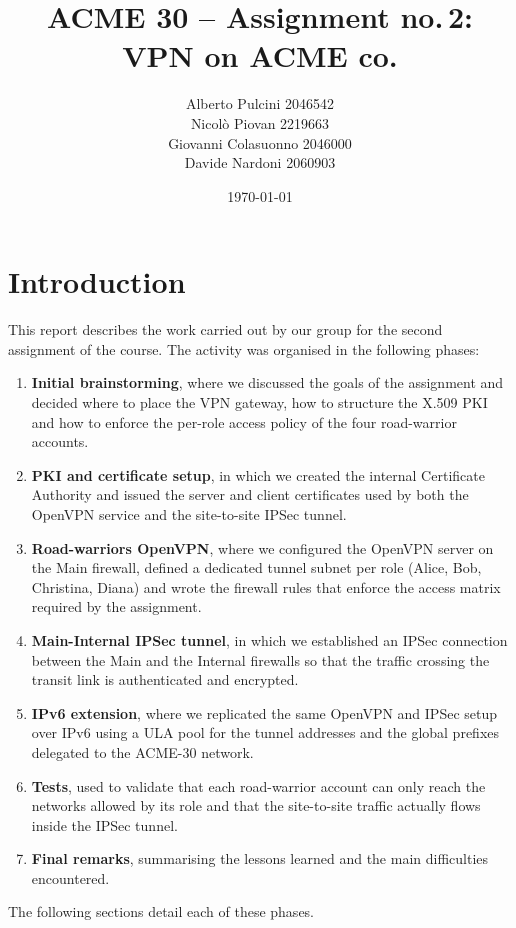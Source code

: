 \documentclass[twocolumn]{NobArticle}
\title{ACME 30 -- Assignment no.\,2: VPN on ACME co.}
\author{
    Alberto Pulcini 2046542 \\
    Nicolò Piovan 2219663 \\
    Giovanni Colasuonno 2046000 \\
    Davide Nardoni 2060903
}
\date{\today}
\begin{document}
\maketitle
\thispagestyle{empty}

\section{Introduction}

This report describes the work carried out by our group for the second
assignment of the course. The activity was organised in the following phases:

\begin{enumerate}
    \item \textbf{Initial brainstorming}, where we discussed the goals of the
    assignment and decided where to place the VPN gateway, how to structure
    the X.509 PKI and how to enforce the per-role access policy of the four
    road-warrior accounts.
    \item \textbf{PKI and certificate setup}, in which we created the internal
    Certificate Authority and issued the server and client certificates used
    by both the OpenVPN service and the site-to-site IPSec tunnel.
    \item \textbf{Road-warriors OpenVPN}, where we configured the OpenVPN
    server on the Main firewall, defined a dedicated tunnel subnet per role
    (Alice, Bob, Christina, Diana) and wrote the firewall rules that enforce
    the access matrix required by the assignment.
    \item \textbf{Main-Internal IPSec tunnel}, in which we established an
    IPSec connection between the Main and the Internal firewalls so that the
    traffic crossing the transit link is authenticated and encrypted.
    \item \textbf{IPv6 extension}, where we replicated the same OpenVPN and
    IPSec setup over IPv6 using a ULA pool for the tunnel addresses and the
    global prefixes delegated to the ACME-30 network.
    \item \textbf{Tests}, used to validate that each road-warrior account can
    only reach the networks allowed by its role and that the site-to-site
    traffic actually flows inside the IPSec tunnel.
    \item \textbf{Final remarks}, summarising the lessons learned and the
    main difficulties encountered.
\end{enumerate}

The following sections detail each of these phases.
\end{document}
